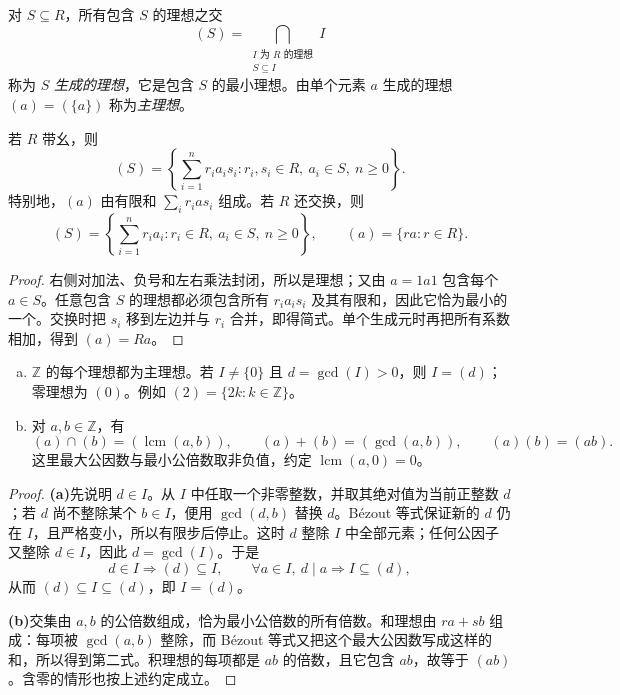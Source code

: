 \documentclass[lang=cn,a4paper,fontset=none,zihao=false,10pt,openany,twoside]{beautybook}
\numberwithin{algorithm}{chapter}
\begin{document}
\begin{definition}[生成理想与主理想]
对 $S\subseteq R$，所有包含 $S$ 的理想之交
\[
 (S)=\bigcap_{\substack{I\text{ 为 }R\text{ 的理想}\\S\subseteq I}}I
\]
称为 $S$ \emph{生成的理想}，它是包含 $S$ 的最小理想。由单个元素 $a$ 生成的理想 $(a)=(\{a\})$ 称为\emph{主理想}。
\end{definition}
\begin{proposition}[带幺环中的生成理想]
若 $R$ 带幺，则
\[
 (S)=\left\{\sum_{i=1}^n r_i a_i s_i:r_i,s_i\in R,\ a_i\in S,\ n\ge0\right\}.
\]
特别地，$(a)$ 由有限和 $\sum_i r_i a s_i$ 组成。若 $R$ 还交换，则
\[
 (S)=\left\{\sum_{i=1}^n r_i a_i:r_i\in R,\ a_i\in S,\ n\ge0\right\},
 \qquad (a)=\{ra:r\in R\}.
\]
\end{proposition}
\begin{proof}
右侧对加法、负号和左右乘法封闭，所以是理想；又由 $a=1a1$ 包含每个 $a\in S$。任意包含 $S$ 的理想都必须包含所有 $r_i a_i s_i$ 及其有限和，因此它恰为最小的一个。交换时把 $s_i$ 移到左边并与 $r_i$ 合并，即得简式。单个生成元时再把所有系数相加，得到 $(a)=Ra$。
\end{proof}

\begin{example}[整数环的理想]
\begin{enumerate}[(a)]
\item $\mathbb Z$ 的每个理想都为主理想。若 $I\ne\{0\}$ 且 $d=\gcd(I)>0$，则 $I=(d)$；零理想为 $(0)$。例如 $(2)=\{2k:k\in\mathbb Z\}$。
\item 对 $a,b\in\mathbb Z$，有
\[
 (a)\cap(b)=(\operatorname{lcm}(a,b)),\qquad
 (a)+(b)=(\gcd(a,b)),\qquad(a)(b)=(ab).
\]
这里最大公因数与最小公倍数取非负值，约定 $\operatorname{lcm}(a,0)=0$。
\end{enumerate}
\end{example}
\begin{proof}
\par\smallskip\noindent\textbf{(a)}\quad 先说明 $d\in I$。从 $I$ 中任取一个非零整数，并取其绝对值为当前正整数 $d$；若 $d$ 尚不整除某个 $b\in I$，便用 $\gcd(d,b)$ 替换 $d$。B\'ezout 等式保证新的 $d$ 仍在 $I$，且严格变小，所以有限步后停止。这时 $d$ 整除 $I$ 中全部元素；任何公因子又整除 $d\in I$，因此 $d=\gcd(I)$。于是
\[
 d\in I\Longrightarrow(d)\subseteq I,
 \qquad \forall a\in I,\ d\mid a\Longrightarrow I\subseteq(d),
\]
从而 $(d)\subseteq I\subseteq(d)$，即 $I=(d)$。
\par\smallskip\noindent\textbf{(b)}\quad 交集由 $a,b$ 的公倍数组成，恰为最小公倍数的所有倍数。和理想由 $ra+sb$ 组成：每项被 $\gcd(a,b)$ 整除，而 B\'ezout 等式又把这个最大公因数写成这样的和，所以得到第二式。积理想的每项都是 $ab$ 的倍数，且它包含 $ab$，故等于 $(ab)$。含零的情形也按上述约定成立。
\end{proof}
\end{document}
